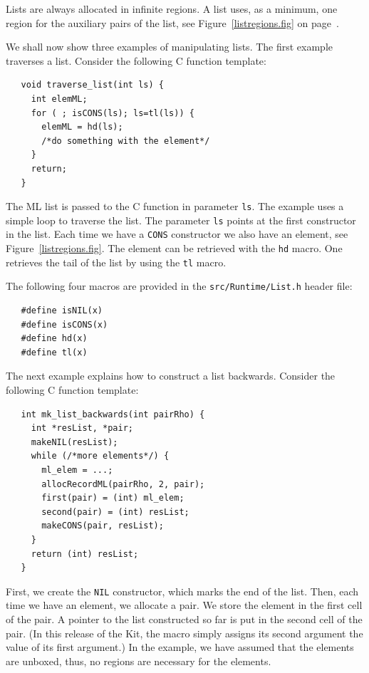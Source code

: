 \documentclass[12pt]{book}
\begin{document}
Lists are always allocated in infinite regions. A list uses, as a minimum,
one region for the auxiliary pairs of the list, see Figure~\ref{listregions.fig} on page~\pageref{listregions.fig}.

We shall now show three examples of manipulating lists. The first example
traverses a list. Consider the following C function template:
%
\begin{verbatim}
   void traverse_list(int ls) {
     int elemML;
     for ( ; isCONS(ls); ls=tl(ls)) {
       elemML = hd(ls);
       /*do something with the element*/
     }
     return;
   }
\end{verbatim}

The ML list is passed to the C function in parameter \texttt{ls}.
The example uses a simple loop to traverse the list. The parameter
\texttt{ls} points at the first constructor in the list. Each time
we have a \texttt{CONS} constructor we also have an element, see
Figure~\ref{listregions.fig}. The element can be retrieved with the
\texttt{hd} macro.  One retrieves the tail of the list by using the
\texttt{tl} macro.

The following four macros are provided in the {\tt src/Runtime/List.h}
header file:
%
%
%
%
\begin{verbatim}
   #define isNIL(x)
   #define isCONS(x)
   #define hd(x)
   #define tl(x)
\end{verbatim}
                                
The next example explains how to construct a list backwards. Consider
the following C function template:
%
\begin{verbatim}
   int mk_list_backwards(int pairRho) {
     int *resList, *pair;
     makeNIL(resList);  
     while (/*more elements*/) {
       ml_elem = ...;
       allocRecordML(pairRho, 2, pair);
       first(pair) = (int) ml_elem;
       second(pair) = (int) resList;
       makeCONS(pair, resList);
     }
     return (int) resList;
   }
\end{verbatim}
First, we create the \texttt{NIL} constructor, which marks the end of
the list. Then, each time we have an element, we allocate a pair. We
store the element in the first cell of the pair. A pointer to the list
constructed so far is put in the second cell of the pair. (In this
release of the Kit, the  macro simply assigns its
second argument the value of its first argument.) In the example, we
have assumed that the elements are unboxed, thus, no regions are
necessary for the elements.
\end{document}

